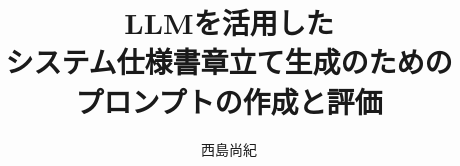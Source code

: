 \documentclass[uplatex, report, a4j, 10pt, dvipdfmx]{jsbook}
\title{LLMを活用した\\システム仕様書章立て生成のための\\プロンプトの作成と評価}
\author{西島尚紀}
\begin{document}
\maketitle





%








% 






%



%
%
\nocite{*}
%
\end{document}
